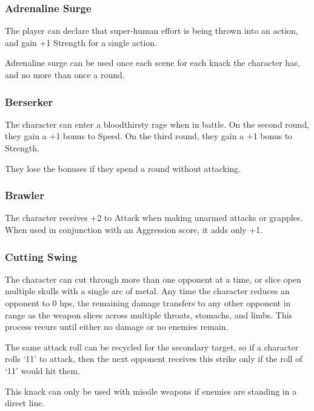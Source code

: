 \begin{multicols}{2}

\subsubsection{Adrenaline Surge}
\label{adrenalinesurge}

The player can declare that super-human effort is being thrown into an action, and gain +1 Strength for a single action.

Adrenaline surge can be used once each scene for each knack the character has, and no more than once a \gls{round}.

\subsubsection{Berserker}

The character can enter a bloodthirsty rage when in battle.
On the second round, they gain a +1 bonus to Speed.
On the third round, they gain a +1 bonus to Strength.

They lose the bonuses if they spend a round without attacking.

\subsubsection{Brawler}

The character receives +2 to Attack when making unarmed attacks or grapples.
When used in conjunction with an Aggression score, it adds only +1.

\subsubsection{Cutting Swing}

The character can cut through more than one opponent at a time, or slice open multiple skulls with a single arc of metal.
Any time the character reduces an opponent to 0 \glspl{hp}, the remaining damage transfers to any other opponent in range as the weapon slices across multiple throats, stomachs, and limbs.
This process recurs until either no damage or no enemies remain.

The same attack roll can be recycled for the secondary target, so if a character rolls `11' to attack, then the next opponent receives this strike only if the roll of `11' would hit them.

This knack can only be used with missile weapons if enemies are standing in a direct line.


\end{multicols}
